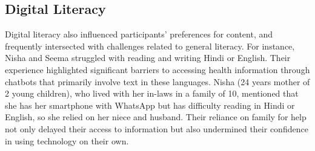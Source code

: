 
{\subsection{Digital Literacy}}
Digital literacy also influenced participants' preferences for content, and frequently intersected with challenges related to general literacy. 
For instance, Nisha and Seema struggled with reading and writing Hindi or English. 
Their experience %
highlighted significant barriers to accessing health information through chatbots that primarily involve text in these languages. Nisha (24 years mother of 2 young children), who lived with her in-laws in a family of 10, mentioned that she has her smartphone with WhatsApp but has difficulty reading in Hindi or English, so she relied on her niece and husband. Their reliance on family for help not only delayed their access to information but also undermined their confidence in using technology on their own.

